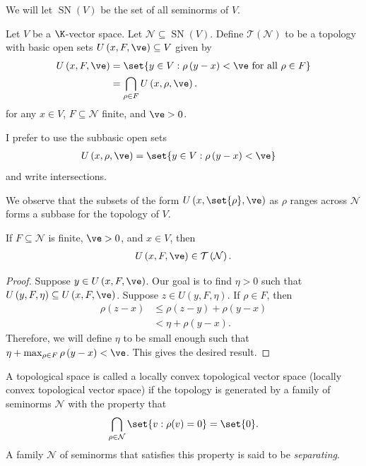 \documentclass[10pt]{mypackage}
\begin{document}
We will let $ \operatorname{SN}(V) $ be the set of all seminorms of $V$. 
\begin{definition}
  Let $V$ be a $\K$-vector space. Let $ \mathcal{N}\subseteq \operatorname{SN}(V) $. Define $ \mathcal{T} \left( \mathcal{N} \right) $ to be a topology with basic open sets $U\left( x,F,\ve \right)\subseteq V$ given by
  \begin{align*}
    U\left( x,F,\ve \right) &= \set{y\in V : \rho\left( y-x \right) < \ve\text{ for all }\rho\in F}\\
                            &= \bigcap_{\rho\in F} U\left( x,\rho,\ve \right).
  \end{align*}
  for any $x\in V$, $ F\subseteq \mathcal{N} $ finite, and $\ve > 0$.
\end{definition}
\begin{remark}
  I prefer to use the subbasic open sets
  \begin{align*}
    U\left( x,\rho, \ve \right)&= \set{y\in V : \rho\left( y-x \right) < \ve}
  \end{align*}
  and write intersections.
\end{remark}
We observe that the subsets of the form $U\left( x,\set{\rho},\ve \right)$ as $\rho$ ranges across $ \mathcal{N} $ forms a subbase for the topology of $V$.
\begin{proposition}
  If $F\subseteq \mathcal{N}$ is finite, $ \ve > 0 $, and $x\in V$, then
  \begin{align*}
    U\left( x,F,\ve \right)\in \mathcal{T}\left( \mathcal{N} \right).
  \end{align*}
\end{proposition}
\begin{proof}
  Suppose $y\in U\left( x,F,\ve \right)$. Our goal is to find $\eta > 0$ such that $U\left( y,F,\eta \right) \subseteq U\left( x,F,\ve \right)$. Suppose $z\in U\left( y,F,\eta \right)$. If $\rho\in F$, then
  \begin{align*}
    \rho\left( z-x \right) &\leq \rho\left( z-y \right) + \rho\left( y-x \right)\\
                           &< \eta + \rho\left( y-x \right).
  \end{align*}
  Therefore, we will define $\eta$ to be small enough such that $\eta + \max_{\rho\in F} \rho\left( y-x \right) < \ve$. This gives the desired result.
\end{proof}
\begin{definition}
  A topological space is called a locally convex topological vector space (locally convex topological vector space) if the topology is generated by a family of seminorms $\mathcal{N}$ with the property that
  \begin{align*}
    \bigcap_{\rho\in \mathcal{N}} \set{v : \rho(v) = 0} = \set{0}.
  \end{align*}
  A family $\mathcal{N}$ of seminorms that satisfies this property is said to be \textit{separating}.
\end{definition}
\end{document}
